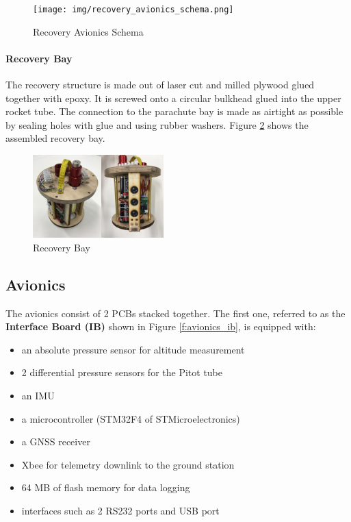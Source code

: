   \begin{figure}[h!]
 	\centering
        \texttt{[image: img/recovery\_avionics\_schema.png]}
        \caption{Recovery Avionics Schema}
        \label{f:recovery_avionics_schema}
 \end{figure}


\paragraph{Recovery Bay} 
 The recovery structure is made out of laser cut and milled plywood glued together with epoxy. It is screwed onto a circular bulkhead glued into the upper rocket tube. The connection to the parachute bay is made as airtight as possible by sealing holes with glue and using rubber washers.
Figure \ref{f:recovery_bay} shows the assembled recovery bay.
 \begin{figure}[h!]
 	\centering
        \includegraphics[width=0.45\textwidth]{img/recovery_bay.jpg}
        \caption{Recovery Bay}
        \label{f:recovery_bay}
 \end{figure}
 
 
\subsection{Avionics}
The avionics consist of 2 PCBs stacked together. The first one, referred to as the \textbf{Interface Board (IB)} shown in Figure \ref{f:avionics_ib}, is equipped with:
\begin{itemize}[noitemsep]
    \item an absolute pressure sensor for altitude measurement
    \item 2 differential pressure sensors for the Pitot tube
    \item an IMU
    \item a microcontroller (STM32F4 of STMicroelectronics)
    \item a GNSS receiver
    \item Xbee for telemetry downlink to the ground station
    \item 64 MB of flash memory for data logging
    \item interfaces such as 2 RS232 ports and USB port
\end{itemize}

